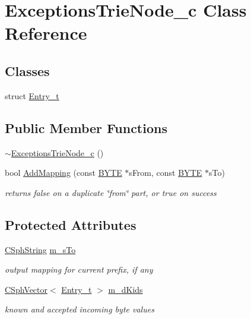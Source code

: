 \hypertarget{classExceptionsTrieNode__c}{\section{Exceptions\-Trie\-Node\-\_\-c Class Reference}
\label{classExceptionsTrieNode__c}
}
\subsection*{Classes}
\begin{DoxyCompactItemize}
\item 
struct \hyperlink{structExceptionsTrieNode__c_1_1Entry__t}{Entry\-\_\-t}
\end{DoxyCompactItemize}
\subsection*{Public Member Functions}
\begin{DoxyCompactItemize}
\item 
\hyperlink{classExceptionsTrieNode__c_a2d0299ae94c93ad102f19c980acbad5a}{$\sim$\-Exceptions\-Trie\-Node\-\_\-c} ()
\item 
bool \hyperlink{classExceptionsTrieNode__c_a089250591c5e07fded453bcfee2e5956}{Add\-Mapping} (const \hyperlink{sphinxstd_8h_a4ae1dab0fb4b072a66584546209e7d58}{B\-Y\-T\-E} $\ast$s\-From, const \hyperlink{sphinxstd_8h_a4ae1dab0fb4b072a66584546209e7d58}{B\-Y\-T\-E} $\ast$s\-To)
\begin{DoxyCompactList}\small\item\em returns false on a duplicate \char`\"{}from\char`\"{} part, or true on success \end{DoxyCompactList}\end{DoxyCompactItemize}
\subsection*{Protected Attributes}
\begin{DoxyCompactItemize}
\item 
\hyperlink{structCSphString}{C\-Sph\-String} \hyperlink{classExceptionsTrieNode__c_a72078664cf6cdc0fbe7bf23f6acb35ea}{m\-\_\-s\-To}
\begin{DoxyCompactList}\small\item\em output mapping for current prefix, if any \end{DoxyCompactList}\item 
\hyperlink{classCSphVector}{C\-Sph\-Vector}$<$ \hyperlink{structExceptionsTrieNode__c_1_1Entry__t}{Entry\-\_\-t} $>$ \hyperlink{classExceptionsTrieNode__c_ac01a27b16e7aa85337570631fecd30c4}{m\-\_\-d\-Kids}
\begin{DoxyCompactList}\small\item\em known and accepted incoming byte values \end{DoxyCompactList}\end{DoxyCompactItemize}
